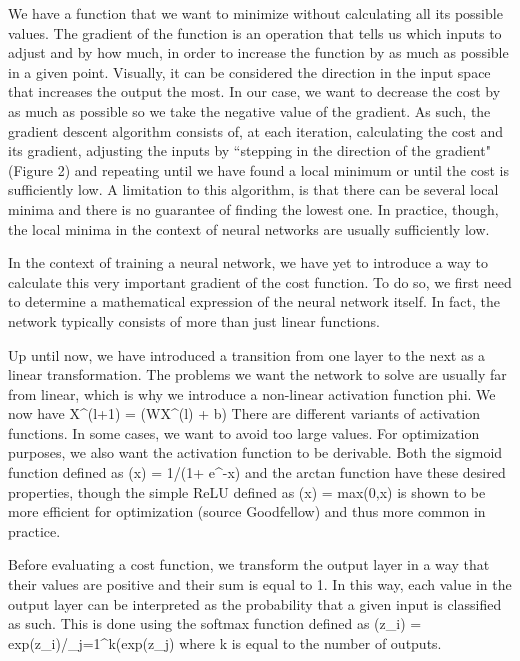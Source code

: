 \startsubsection[title=Optimization using gradient descent]
We have a function that we want to minimize without calculating all its possible values. 
The gradient of the function is an operation that tells us which inputs to adjust and by how much, in order to increase the function by as much as possible in a given point. 
Visually, it can be considered the direction in the input space that increases the output the most. 
In our case, we want to decrease the cost by as much as possible so we take the negative value of the gradient. 
As such, the gradient descent algorithm consists of, at each iteration, calculating the cost and its gradient, adjusting the inputs by “stepping in the direction of the gradient" (Figure 2) and repeating until we have found a local minimum or until the cost is sufficiently low. 
A limitation to this algorithm, is that there can be several local minima and there is no guarantee of finding the lowest one. 
In practice, though, the local minima in the context of neural networks are usually sufficiently low. 

In the context of training a neural network, we have yet to introduce a way to calculate this very important gradient of the cost function. 
To do so, we first need to determine a mathematical expression of the neural network itself. 
In fact, the network typically consists of more than just linear functions.
 
\stopsubsection
 

\startsubsection[title=Activation function] 
Up until now, we have introduced a transition from one layer to the next as a linear transformation. 
The problems we want the network to solve are usually far from linear, which is why we introduce a non-linear activation function phi. We now have
\startformula
X^(l+1) = \phi(WX^(l) + b)
\stopformula
There are different variants of activation functions. In some cases, we want to avoid too large values.  
For optimization purposes, we also want the activation function to be derivable. 
Both the sigmoid function defined as 
\startformula
\phi(x) = 1/(1+ e^-x) 
\stopformula
and the arctan function have these desired properties, though the simple ReLU defined as 
\startformula
\phi(x) = max(0,x) 
\stopformula
is shown to be more efficient for optimization (source Goodfellow) and thus more common in practice.

\stopsubsection

\startsubsection[title=Softmax, loss and cost function ]
Before evaluating a cost function, we transform the output layer in a way that their values are positive and their sum is equal to 1. 
In this way, each value in the output layer can be interpreted as the probability that a given input is classified as such.
This is done using the softmax function defined as
\startformula
\sigma(z_i) = exp(z_i)/\sum_{j=1}^k(exp(z_j) 
\stopformula
where k is equal to the number of outputs. 
 
